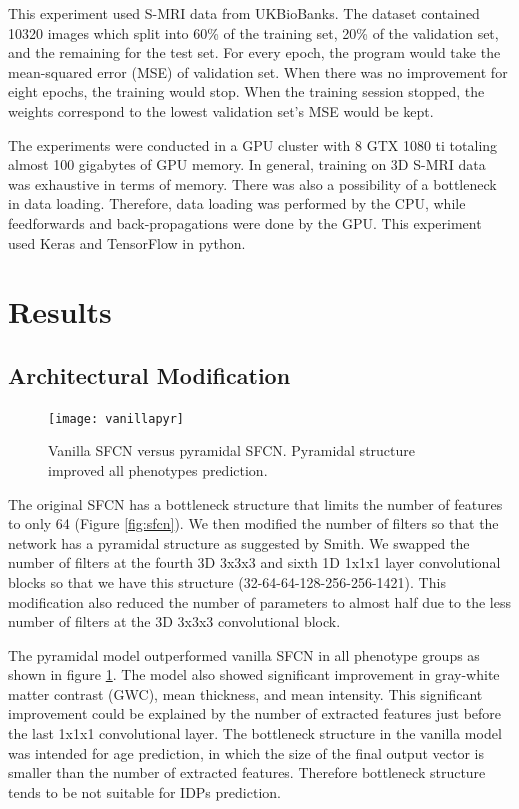 \documentclass{article}
\begin{document}
    This experiment used S-MRI data from UKBioBanks. 
    The dataset contained 10320 images which split into 60\% of the training set, 20\% of the validation set, and the remaining for the test set. 
    For every epoch, the program would take the mean-squared error (MSE) of validation set. 
    When there was no improvement for eight epochs, the training would stop. 
    When the training session stopped, the weights correspond to the lowest validation set's MSE would be kept.

    The experiments were conducted in a GPU cluster with 8 GTX 1080 ti totaling almost 100 gigabytes of GPU memory. 
    In general, training on 3D S-MRI data was exhaustive in terms of memory. 
    There was also a possibility of a bottleneck in data loading. 
    Therefore, data loading was performed by the CPU, while feedforwards and back-propagations were done by the GPU. 
    This experiment used Keras and TensorFlow in python.
    \section*{Results}
    
    \subsection*{Architectural Modification}
    \begin{figure}[h]
        \centering
        \texttt{[image: vanillapyr]}
        \centering
        \caption{
            Vanilla SFCN versus pyramidal SFCN. 
            Pyramidal structure improved all phenotypes prediction.}
        \label{fig:vanillapyr}
    \end{figure}
    The original SFCN has a bottleneck structure that limits the number of features to only 64 (Figure \ref{fig:sfcn}). 
    We then modified the number of filters so that the network has a pyramidal structure as suggested by Smith\cite*[]{smith}.  
    We swapped the number of filters at the fourth 3D 3x3x3 and sixth 1D 1x1x1 layer convolutional blocks so that we have this structure (32-64-64-128-256-256-1421). 
    This modification also reduced the number of parameters to almost half due to the less number of filters at the 3D 3x3x3 convolutional block.

    The pyramidal model outperformed vanilla SFCN in all phenotype groups as shown in figure \ref{fig:vanillapyr}. 
    The model also showed significant improvement in gray-white matter contrast (GWC), mean thickness, and mean intensity. 
    This significant improvement could be explained by the number of extracted features just before the last 1x1x1 convolutional layer. 
    The bottleneck structure in the vanilla model was intended for age prediction, in which the size of the final output vector is smaller than the number of extracted features. 
    Therefore bottleneck structure tends to be not suitable for IDPs prediction.
\end{document}
